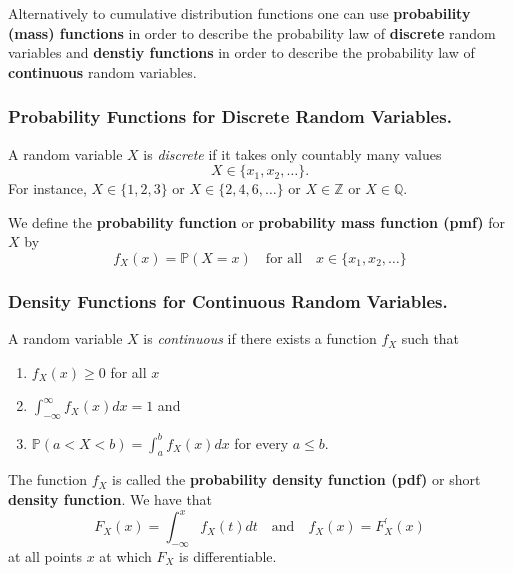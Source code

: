 \documentclass[
  14pt,
]{memoir}
\begin{document}
\bigskip

Alternatively to cumulative distribution functions one can use \textbf{probability (mass) functions} in order to describe the probability law of \textbf{discrete} random variables and \textbf{denstiy functions} in order to describe the probability law of \textbf{continuous} random variables.

\hypertarget{probability-functions-for-discrete-random-variables.}{%
\subsubsection{Probability Functions for Discrete Random Variables.}\label{probability-functions-for-discrete-random-variables.}}

A random variable \(X\) is \textit{discrete} if it takes only countably many values
\[
X\in\{x_{1}, x_{2}, \ldots\}.
\]
For instance, \(X\in\{1,2,3\}\) or \(X\in\{2,4,6,\dots\}\) or \(X\in\mathbb{Z}\) or \(X\in\mathbb{Q}\).

We define the \textbf{probability function} or \textbf{probability mass function (pmf)} for \(X\) by
\[
f_{X}(x)=\mathbb{P}(X=x)\quad\text{for all}\quad x\in\{x_1,x_2,\dots\}
\]

\bigskip

\hypertarget{density-functions-for-continuous-random-variables.}{%
\subsubsection{Density Functions for Continuous Random Variables.}\label{density-functions-for-continuous-random-variables.}}

A random variable \(X\) is \textit{continuous} if there exists a function \(f_{X}\) such that

\begin{enumerate}
\item $f_{X}(x)\geq 0$ for all $x$
\item $\int_{-\infty}^{\infty}f_{X}(x)dx=1$ and 
\item $\mathbb{P}(a<X<b)=\int_{a}^{b} f_{X}(x) dx$ for every $a\leq b$.
\end{enumerate}

\noindent The function \(f_{X}\) is called the \textbf{probability density function (pdf)} or short \textbf{density function}. We have that
\[
F_{X}(x)=\int_{-\infty}^{x} f_{X}(t) dt\quad\text{and}\quad f_{X}(x)=F_{X}^{\prime}(x)
\]
at all points \(x\) at which \(F_{X}\) is differentiable.
\end{document}
